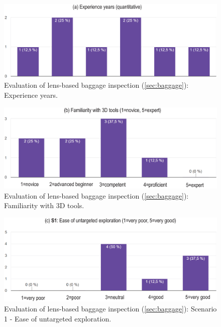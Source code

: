 \begin{figure}
\centering
\includegraphics [width=\textwidth]{images/graph1.eps}
\caption{Evaluation of lens-based baggage inspection (\autoref{sec:baggage}): Experience years.}
\label{fig:graph1}

\end{figure}


\begin{figure}
\centering
\includegraphics [width=\textwidth]{images/graph2.eps}
\caption{Evaluation of lens-based baggage inspection (\autoref{sec:baggage}): Familiarity with 3D tools.}
\label{fig:graph2}
\end{figure}


\begin{figure}
\centering
\includegraphics [width=\textwidth]{images/graph3.eps}
\caption{Evaluation of lens-based baggage inspection (\autoref{sec:baggage}): Scenario 1 - Ease of untargeted exploration.}
\label{fig:graph3}
\end{figure}


